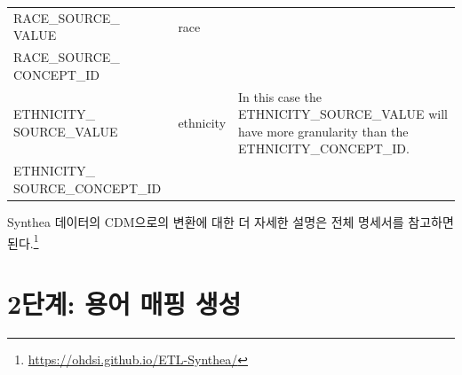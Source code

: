\documentclass[10.5pt]{book}
\let\rmarkdownfootnote\footnote%
\def\footnote{\protect\rmarkdownfootnote}
\theoremstyle{definition}
\theoremstyle{definition}
\theoremstyle{definition}
\theoremstyle{remark}
\begin{document}
\begin{longtable}[]{@{}lll@{}}
\begin{minipage}[t]{0.28\columnwidth}
RACE\_SOURCE\_ VALUE\strut
\end{minipage} & \begin{minipage}[t]{0.13\columnwidth}\raggedright\strut
race\strut
\end{minipage} & \begin{minipage}[t]{0.50\columnwidth}\raggedright\strut
\strut
\end{minipage}\tabularnewline
\begin{minipage}[t]{0.28\columnwidth}\raggedright\strut
RACE\_SOURCE\_ CONCEPT\_ID\strut
\end{minipage} & \begin{minipage}[t]{0.13\columnwidth}\raggedright\strut
\strut
\end{minipage} & \begin{minipage}[t]{0.50\columnwidth}\raggedright\strut
\strut
\end{minipage}\tabularnewline
\begin{minipage}[t]{0.28\columnwidth}\raggedright\strut
ETHNICITY\_ SOURCE\_VALUE\strut
\end{minipage} & \begin{minipage}[t]{0.13\columnwidth}\raggedright\strut
ethnicity\strut
\end{minipage} & \begin{minipage}[t]{0.50\columnwidth}\raggedright\strut
In this case the ETHNICITY\_SOURCE\_VALUE will have more granularity
than the ETHNICITY\_CONCEPT\_ID.\strut
\end{minipage}\tabularnewline
\begin{minipage}[t]{0.28\columnwidth}\raggedright\strut
ETHNICITY\_ SOURCE\_CONCEPT\_ID\strut
\end{minipage} & \begin{minipage}[t]{0.13\columnwidth}\raggedright\strut
\strut
\end{minipage} & \begin{minipage}[t]{0.50\columnwidth}\raggedright\strut
\strut
\end{minipage}\tabularnewline
\bottomrule
\end{longtable}

Synthea 데이터의 CDM으로의 변환에 대한 더 자세한 설명은 전체 명세서를
참고하면 된다.\footnote{\url{https://ohdsi.github.io/ETL-Synthea/}}

\section{2단계: 용어 매핑 생성}\label{---}
\end{document}
